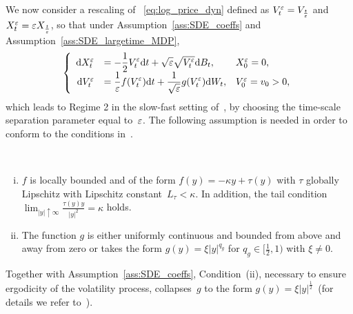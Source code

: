 We now consider a rescaling of ~\eqref{eq:log_price_dyn}
defined as $V_t^\varepsilon = V_{\frac{t}{\varepsilon}}$ and $X_t^\varepsilon = \varepsilon X_{\frac{t}{\varepsilon}}$, so that under Assumption~\ref{ass:SDE_coeffs} and Assumption~\ref{ass:SDE_largetime_MDP},
\begin{equation}\label{eq:large_time_MD_dynamics}
\left\{
\begin{array}{rll}
\mathrm{d} X^\varepsilon_t &= \displaystyle -\frac{1}{2}V_t^\varepsilon \mathrm{d} t + \sqrt{\varepsilon}\sqrt{V_t^\varepsilon}\mathrm{d} B_t, 
& X_0^\varepsilon = 0,\\
\mathrm{d} V_t^\varepsilon &= \displaystyle \frac{1}{\varepsilon}f(V_t^\varepsilon)\mathrm{d} t + \frac{1}{\sqrt{\varepsilon}}g(V_t^\varepsilon)\mathrm{d} W_t, 
& V_0^\varepsilon = v_0>0,
\end{array}
\right.\end{equation}
which leads to Regime 2 in the slow-fast setting of~\cite[Theorem 2.1]{Morse2017ModerateDiffusions}, 
by choosing the time-scale separation parameter equal to~$\varepsilon$. The following assumption is needed in order to conform to the conditions in~\cite{Morse2017ModerateDiffusions}.
\begin{assumption}\label{ass:SDE_largetime_MDP}\
\begin{enumerate}[(i)]
    \item $f$ is locally bounded and of the form $f(y) = -\kappa y +\tau(y)$ with $\tau$ globally Lipschitz with Lipschitz constant~$L_{\tau}<\kappa$. In addition, the tail condition $\lim_{|y| \uparrow\infty}\frac{\tau(y)y}{|y|^2} = \kappa$ holds.
    \item The function $g$ is either uniformly continuous and bounded from above and away from zero or takes the form $g(y) = \xi |y|^{q_g}$ for $q_g \in [\frac{1}{2},1)$ with $\xi\ne 0$.
\end{enumerate}
\end{assumption}
\begin{remark}
Together with Assumption~\ref{ass:SDE_coeffs}, 
Condition~(ii), necessary to ensure ergodicity of the volatility process, collapses~$g$ to the form $g(y)=\xi |y|^\frac{1}{2}\,$ (for details we refer to~\cite{Jacquier2019PathwisePricing,Morse2017ModerateDiffusions}).
\end{remark}

